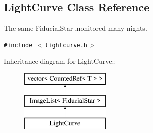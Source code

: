 \subsection{Light\-Curve  Class Reference}
\label{class_lightcurve}
The same Fiducial\-Star monitored many nights. 


{\tt \#include $<$lightcurve.h$>$}

Inheritance diagram for Light\-Curve::\begin{figure}[H]
\begin{center}
\leavevmode
\includegraphics[height=3cm]{class_lightcurve}
\end{center}
\end{figure}
